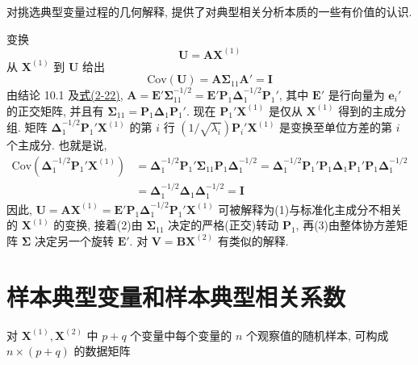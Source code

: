 
对挑选典型变量过程的几何解释, 提供了对典型相关分析本质的一些有价值的认识.

变换
\[
\mathbf{U}=\mathbf{A}\mathbf{X}^{(1)}
\]
从 $\mathbf{X}^{(1)}$ 到 $\mathbf{U}$ 给出
\[
\mathrm{Cov}(\mathbf{U})=\mathbf{A}\boldsymbol{\Sigma}_{11}\mathbf{A}'=\mathbf{I}
\]
由结论 10.1 及\hyperref[eq:2-22]{式(2-22)}, $\mathbf{A}=\mathbf{E}'\boldsymbol{\Sigma}_{11}^{-1/2}=\mathbf{E}'\mathbf{P}_1\boldsymbol{\Delta}_1^{-1/2}\mathbf{P}_1'$, 其中 $\mathbf{E}'$ 是行向量为 $\mathbf{e}_i'$ 的正交矩阵, 并且有 $\boldsymbol{\Sigma}_{11}=\mathbf{P}_1\boldsymbol{\Delta}_1\mathbf{P}_1'$. 现在 $\mathbf{P}_1'\mathbf{X}^{(1)}$ 是仅从 $\mathbf{X}^{(1)}$ 得到的主成分组. 矩阵 $\boldsymbol{\Delta}_1^{-1/2}\mathbf{P}_1'\mathbf{X}^{(1)}$ 的第 $i$ 行 $(1/\sqrt{\lambda_i})\mathbf{P}_i'\mathbf{X}^{(1)}$ 是变换至单位方差的第 $i$ 个主成分. 也就是说,
\[
\begin{aligned}
\mathrm{Cov}(\boldsymbol{\Delta}_1^{-1/2}\mathbf{P}_1'\mathbf{X}^{(1)})&=\boldsymbol{\Delta}_1^{-1/2}\mathbf{P}_1'\boldsymbol{\Sigma}_{11}\mathbf{P}_1\boldsymbol{\Delta}_1^{-1/2}=\boldsymbol{\Delta}_1^{-1/2}\mathbf{P}_1'\mathbf{P}_1\boldsymbol{\Delta}_1\mathbf{P}_1'\mathbf{P}_1\boldsymbol{\Delta}_1^{-1/2}\\
&=\boldsymbol{\Delta}_1^{-1/2}\boldsymbol{\Delta}_1\boldsymbol{\Delta}_1^{-1/2}=\mathbf{I}
\end{aligned}
\]
因此, $\mathbf{U}=\mathbf{A}\mathbf{X}^{(1)}=\mathbf{E}'\mathbf{P}_1\boldsymbol{\Delta}_1^{-1/2}\mathbf{P}_1'\mathbf{X}^{(1)}$ 可被解释为(1)与标准化主成分不相关的 $\mathbf{X}^{(1)}$ 的变换, 接着(2)由 $\boldsymbol{\Sigma}_{11}$ 决定的严格(正交)转动 $\mathbf{P}_1$, 再(3)由整体协方差矩阵 $\boldsymbol{\Sigma}$ 决定另一个旋转 $\mathbf{E}'$. 对 $\mathbf{V}=\mathbf{B}\mathbf{X}^{(2)}$ 有类似的解释.

\section{样本典型变量和样本典型相关系数}
\label{sec:10.4}

对 $\mathbf{X}^{(1)},\mathbf{X}^{(2)}$ 中 $p+q$ 个变量中每个变量的 $n$ 个观察值的随机样本, 可构成 $n\times(p+q)$ 的数据矩阵

